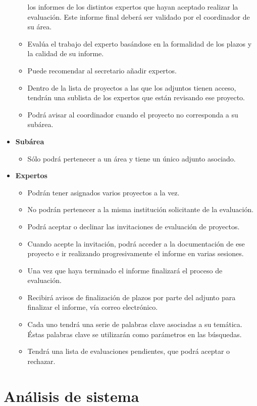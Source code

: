 \documentclass[a4paper,12pt,spanish,twoside]{article}
\begin{document}
\begin{itemize}
\begin{itemize}
los informes de los distintos expertos que hayan aceptado realizar la evaluación. Este informe final deberá ser 
validado por el coordinador de su área.
\item Evalúa el trabajo del experto basándose en la formalidad de los plazos y la calidad de su informe.
\item Puede recomendar al secretario añadir expertos.
\item Dentro de la lista de proyectos a las que los adjuntos tienen acceso, tendrán una sublista de los expertos que están revisando ese proyecto.
\item Podrá avisar al coordinador cuando el proyecto no corresponda a su subárea.
\end{itemize}
\item \textbf{Subárea}
\begin{itemize}
\item Sólo podrá pertenecer a un área y tiene un único adjunto asociado.
\end{itemize}
\item \textbf{Expertos}
\begin{itemize}
\item Podrán tener asignados varios proyectos a la vez. 
\item No podrán pertenecer a la misma institución solicitante de la evaluación.
\item Podrá aceptar o declinar las invitaciones de evaluación de proyectos.
\item Cuando acepte la invitación, podrá acceder a la documentación de ese proyecto e ir realizando progresivamente el informe en varias sesiones.
\item Una vez que haya terminado el informe finalizará el proceso de evaluación.
\item Recibirá avisos de finalización de plazos por parte del adjunto para finalizar el informe, vía correo electrónico.
\item Cada uno tendrá una serie de palabras clave asociadas a su temática. Éstas palabras clave se utilizarán como parámetros en las búsquedas.
\item Tendrá una lista de evaluaciones pendientes, que podrá aceptar o rechazar.

\end{itemize}
\end{itemize}

\section{Análisis de sistema}
\end{document}
